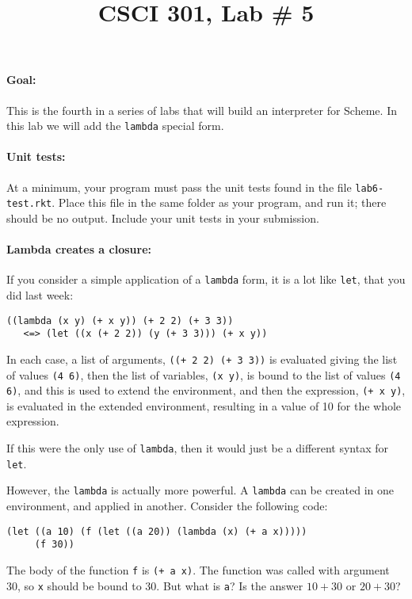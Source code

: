 \documentclass[letterpaper,12pt]{article}
\title{CSCI 301, Lab \# 5}
\author{\term}
\begin{document}
\maketitle
  \paragraph{Goal:} This is the fourth in a series of labs that will build an
  interpreter for Scheme.  In this lab we will add the {\tt lambda} special
  form.

  \paragraph{Unit tests:} At a minimum, your program must pass the unit tests
  found in the file {\tt lab6-test.rkt}.  Place this file in the same folder as
  your program, and run it; there should be no output.  Include your unit tests
  in your submission.

  \paragraph{Lambda creates a closure:} If you consider a simple application of
  a {\tt lambda} form, it is a lot like {\tt let}, that you did last week:
\begin{Verbatim}
((lambda (x y) (+ x y)) (+ 2 2) (+ 3 3)) 
   <=> (let ((x (+ 2 2)) (y (+ 3 3))) (+ x y))
\end{Verbatim}
  In each case, a list of arguments, \texttt{((+ 2 2) (+ 3 3))} is evaluated
  giving the list of values \texttt{(4 6)}, then
  the list of variables, \texttt{(x y)}, is bound to the list
  of values \texttt{(4 6)}, and this is used to extend the environment,
  and then the expression, \texttt{(+ x y)}, is evaluated in the extended
  environment, resulting in a value of 10 for the whole expression.

  If this were the only use of \texttt{lambda}, then it would just be a
  different syntax for \texttt{let}.

  However, the \texttt{lambda} is actually more powerful.  A \texttt{lambda} can
  be created in one environment, and applied in another.  Consider the following
  code:
\begin{Verbatim}[frame=single]
(let ((a 10) (f (let ((a 20)) (lambda (x) (+ a x)))))
     (f 30))
\end{Verbatim}
  The body of the function \texttt{f} is \texttt{(+ a x)}.  The function was
  called with argument 30, so \texttt{x} should be bound to 30.  But what is
  \texttt{a}?  Is the answer $10+30$ or $20+30$?
\end{document}
